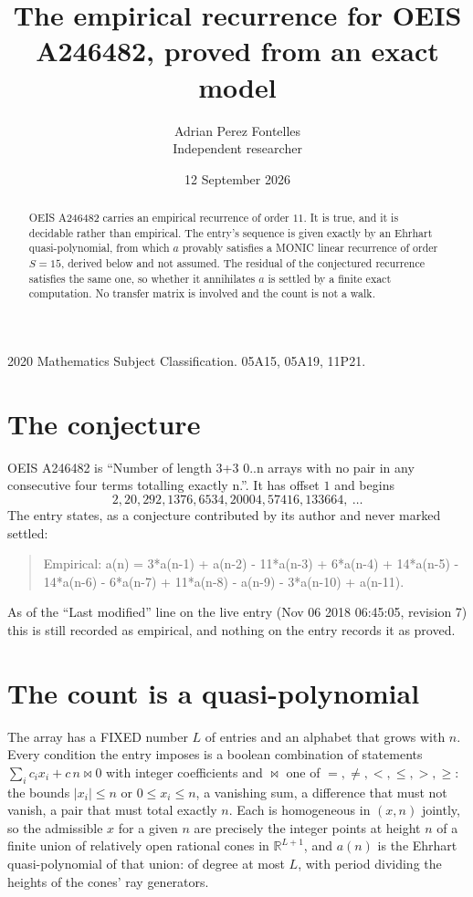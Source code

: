 \documentclass[11pt,a4paper]{article}
\title{The empirical recurrence for OEIS A246482, proved from an exact model}
\author{Adrian Perez Fontelles\\ \small Independent researcher}
\date{12 September 2026}
\theoremstyle{plain}
\theoremstyle{definition}
\begin{document}
\maketitle

\begin{abstract}
OEIS A246482 carries an empirical recurrence of order $11$. It is true, and it is
decidable rather than empirical. The entry's sequence is given exactly by an Ehrhart quasi-polynomial, from
which $a$ provably satisfies a MONIC linear recurrence of order $S=15$, derived below and not
assumed. The residual of the conjectured recurrence satisfies the same one, so whether it
annihilates $a$ is settled by a finite exact computation. No transfer matrix is involved and
the count is not a walk.
\end{abstract}

\noindent\small 2020 Mathematics Subject Classification. 05A15, 05A19, 11P21.\normalsize

\section{The conjecture}

OEIS A246482 is ``Number of length 3+3 0..n arrays with no pair in any consecutive four terms totalling exactly n.''. It has offset $1$ and begins
\[
2, 20, 292, 1376, 6534, 20004, 57416, 133664,\ \dots
\]
The entry states, as a conjecture contributed by its author and never marked settled:
\begin{quote}
Empirical: a(n) = 3*a(n-1) + a(n-2) - 11*a(n-3) + 6*a(n-4) + 14*a(n-5) - 14*a(n-6) - 6*a(n-7) + 11*a(n-8) - a(n-9) - 3*a(n-10) + a(n-11).
\end{quote}
As of the ``Last modified'' line on the live entry (Nov 06 2018 06:45:05, revision 7)
this is still recorded as empirical, and nothing on the entry records it as proved.

\section{The count is a quasi-polynomial}

The array has a FIXED number $L$ of entries and an alphabet that grows with $n$. Every
condition the entry imposes is a boolean combination of statements
$\sum_i c_ix_i + c\,n \bowtie 0$ with integer coefficients and $\bowtie$ one of
$=,\ne,<,\le,>,\ge$: the bounds $|x_i|\le n$ or $0\le x_i\le n$, a vanishing sum, a difference
that must not vanish, a pair that must total exactly $n$. Each is homogeneous in $(x,n)$
jointly, so the admissible $x$ for a given $n$ are precisely the integer points at height $n$
of a finite union of relatively open rational cones in $\mathbb{R}^{L+1}$, and $a(n)$ is
the Ehrhart quasi-polynomial of that union: of degree at most $L$, with period dividing the
heights of the cones' ray generators.
\end{document}
